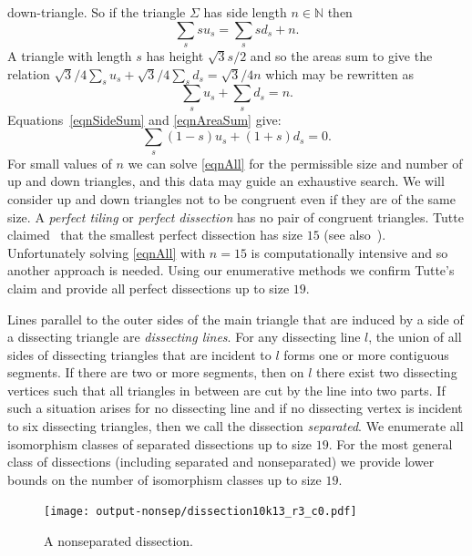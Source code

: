 \documentclass[12pt,amstags,fleqn]{article}
\theoremstyle{plain}
\theoremstyle{definition}
\theoremstyle{definition}
\begin{document}
down-triangle. So if the triangle $\Sigma$ has side length $n \in
\mathbb{N}$ then
\begin{equation}\label{eqnSideSum}
\sum_{s} s u_{s} = \sum_{s} s d_{s} + n.
\end{equation}
A triangle with length ${s}$ has height $\sqrt{3}{s}/2$ and so 
the areas sum to give the relation
$\sqrt{3}/{4} \sum_{s} u_{s} 
+
\sqrt{3}/{4} \sum_{s} d_{s} 
= 
\sqrt{3}/{4} n$
which may be rewritten as
\begin{equation}\label{eqnAreaSum}
\sum_{s} u_{s} 
+
\sum_{s} d_{s} 
= 
n.
\end{equation}
Equations~\eqref{eqnSideSum} and \eqref{eqnAreaSum} give:
\begin{equation}\label{eqnAll}
\sum_{s} (1-s) u_{s} + (1+s)d_{s} = 0.
\end{equation}
For small values of $n$ we can solve \eqref{eqnAll} for the permissible
size and number of up and down triangles, and this data may guide an
exhaustive search.
We will consider up and down triangles not to be congruent even
if they are of the same size. A {\em perfect tiling} or
{\em perfect dissection} has no pair of congruent triangles.
Tutte claimed~\cite{MR0003040,MR0027521} that the smallest perfect
dissection has size $15$ (see also~\cite{squaring}).  Unfortunately
solving \eqref{eqnAll} with $n = 15$ is computationally intensive and so
another approach is needed.  Using our enumerative methods we confirm Tutte's
claim and provide all perfect dissections up to size $19$. 


Lines parallel to the outer sides of the main triangle
that are induced by a side
of a dissecting triangle are \emph{dissecting lines}.
For any dissecting line $l$,
the union of all sides of dissecting triangles
that are incident to $l$ forms
one or more contiguous segments. If there are two or more segments,
then on $l$ there exist
two dissecting vertices such that all
triangles in between are cut by the line into two parts. If such
a situation arises for no dissecting line and if no
dissecting vertex is incident to six dissecting triangles,
then we call the dissection \emph{separated}.
We enumerate all isomorphism classes of 
separated dissections up to size $19$. For
the most general class of dissections (including separated and nonseparated) we
provide lower bounds on the number of isomorphism classes up to size
$19$.
\begin{figure}[hbt]
\begin{center}
\texttt{[image: output-nonsep/dissection10k13\_r3\_c0.pdf]}
\end{center}
\caption{A nonseparated dissection.}
\label{nonsepdissection}
\end{figure}
\end{document}
